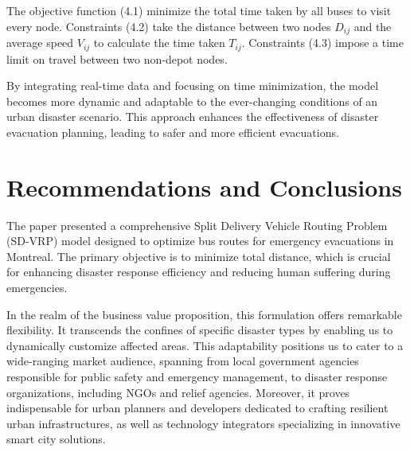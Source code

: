 \documentclass[12pt]{article}
\begin{document}
The objective function (4.1) minimize the total time taken by all buses to visit every node. Constraints (4.2) take the distance between two nodes $D_{ij}$ and the average speed $V_{ij}$ to calculate the time taken $T_{ij}$. Constraints (4.3) impose a time limit on travel between two non-depot nodes.

By integrating real-time data and focusing on time minimization, the model becomes more dynamic and adaptable to the ever-changing conditions of an urban disaster scenario. This approach enhances the effectiveness of disaster evacuation planning, leading to safer and more efficient evacuations.




\newpage
\section{Recommendations and Conclusions}

The paper presented a comprehensive Split Delivery Vehicle Routing Problem (SD-VRP) model designed to optimize bus routes for emergency evacuations in Montreal. The primary objective is to minimize total distance, which is crucial for enhancing disaster response efficiency and reducing human suffering during emergencies.

In the realm of the business value proposition, this formulation offers remarkable flexibility. It transcends the confines of specific disaster types by enabling us to dynamically customize affected areas. This adaptability positions us to cater to a wide-ranging market audience, spanning from local government agencies responsible for public safety and emergency management, to disaster response organizations, including NGOs and relief agencies. Moreover, it proves indispensable for urban planners and developers dedicated to crafting resilient urban infrastructures, as well as technology integrators specializing in innovative smart city solutions.
\end{document}
